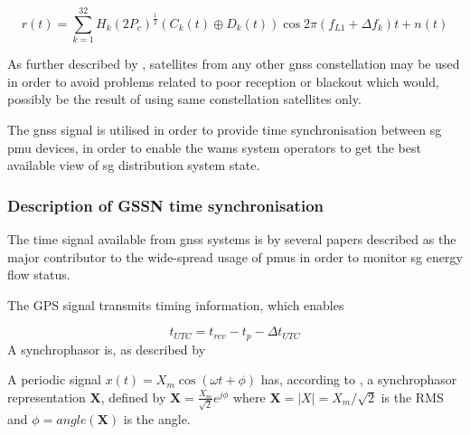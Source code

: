 $$r(t)=\sum_{k=1}^{32}H_{k}(2P_{c})^{\frac{1}{2}}(C_{k}(t)\oplus D_{k}(t))\cos{2\pi}(f_{L1}+\Delta f_{k})t+n(t) $$


As further described by \citeauthor{schmidt2016survey}, satellites from any other \acrshort{gnss} constellation may be used in order to avoid problems related to poor reception or blackout which would, possibly be the result of using same constellation satellites only.


The \acrshort{gnss} signal is utilised in order to provide time synchronisation between \acrshort{sg} \acrshort{pmu} devices, in order to enable the \acrshort{wams} system operators to get the best available 
view of \acrshort{sg} distribution system state.


\subsubsection{Description of GSSN time synchronisation}
The time signal available from \acrfull{gnss} systems is by several papers described as the major contributor to the wide-spread usage of \acrshort{pmu}s in order to monitor \acrlong{sg} energy flow status. 







The GPS signal transmits timing information, which enables 


$$t_{UTC}=t_{rcv}-t_{p}-\Delta t_{UTC}$$
A synchrophasor is, as described by 

















A periodic signal $x(t)=X_m\cos\left(\omega t+\phi \right)$ has, according to \Cite{schofield2018design}, a synchrophasor representation $\mathbf{X}$, defined by $ \mathbf{X} = \frac{X_m}{\sqrt{2}}e^{j\phi} $ where $ \mathbf{X} = |X| = X_m / \sqrt{2} $ is  the RMS and $  \phi = angle(\mathbf{X}) $ is the angle.











